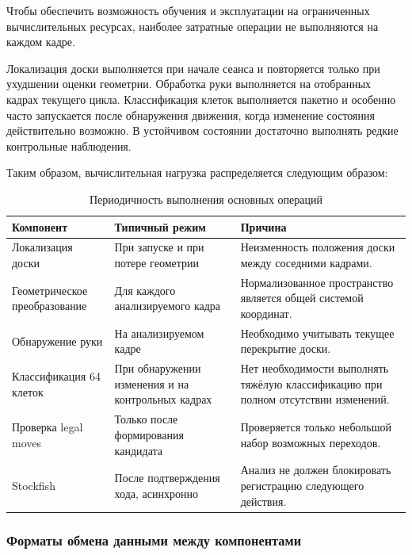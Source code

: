 Чтобы обеспечить возможность обучения и эксплуатации на ограниченных вычислительных ресурсах, наиболее затратные операции не выполняются на каждом кадре.

Локализация доски выполняется при начале сеанса и повторяется только при ухудшении оценки геометрии. Обработка руки выполняется на отобранных кадрах текущего цикла. Классификация клеток выполняется пакетно и особенно часто запускается после обнаружения движения, когда изменение состояния действительно возможно. В устойчивом состоянии достаточно выполнять редкие контрольные наблюдения.

Таким образом, вычислительная нагрузка распределяется следующим образом:

\begin{table}[htbp]
\centering
\caption{Периодичность выполнения основных операций}
\begin{tabular}{|>{\raggedright\arraybackslash}p{}|>{\raggedright\arraybackslash}p{}|>{\raggedright\arraybackslash}p{}|}
\hline
\textbf{Компонент} & \textbf{Типичный режим} & \textbf{Причина} \\
\hline
Локализация доски & При запуске и при потере геометрии & Неизменность положения доски между соседними кадрами. \\
\hline
Геометрическое преобразование & Для каждого анализируемого кадра & Нормализованное пространство является общей системой координат. \\
\hline
Обнаружение руки & На анализируемом кадре & Необходимо учитывать текущее перекрытие доски. \\
\hline
Классификация 64 клеток & При обнаружении изменения и на контрольных кадрах & Нет необходимости выполнять тяжёлую классификацию при полном отсутствии изменений. \\
\hline
Проверка legal moves & Только после формирования кандидата & Проверяется только небольшой набор возможных переходов. \\
\hline
Stockfish & После подтверждения хода, асинхронно & Анализ не должен блокировать регистрацию следующего действия. \\
\hline
\end{tabular}
\end{table}

\subsubsection{Форматы обмена данными между компонентами}


